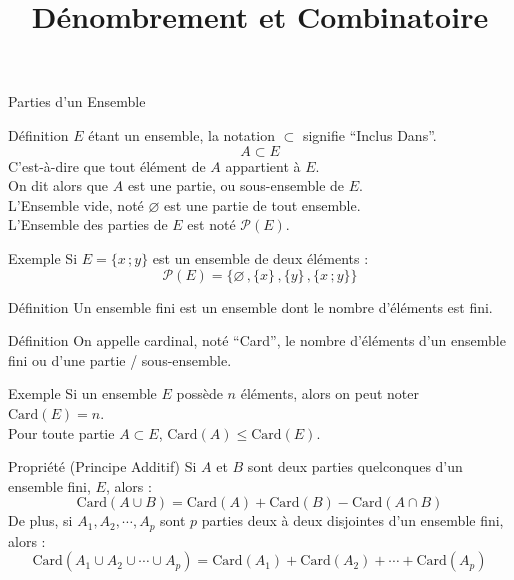 \documentclass{cours}
\begin{document}
    \title{Dénombrement et Combinatoire}

    \begin{Gpartie}{Parties d'un Ensemble}
        \begin{Spartie}{Définition}
            $E$ étant un ensemble, la notation $\subset$ signifie ``Inclus Dans''.
            \[A\subset E\]
            C'est-à-dire que tout élément de $A$ appartient à $E$. \\
            On dit alors que $A$ est une partie, ou sous-ensemble de $E$. \\
            L'Ensemble vide, noté $\varnothing$ est une partie de tout ensemble. \\
            L'Ensemble des parties de $E$ est noté $\mathcal{P}(E)$.
            \begin{SSpartie}{Exemple}
                Si $E=\{x\,;y\}$ est un ensemble de deux éléments :
                \[\mathcal{P}(E)=\{\varnothing\,,\{x\}\,,\{y\}\,,\{x\,;y\}\}\]
            \end{SSpartie}
        \end{Spartie}
        \begin{Spartie}{Définition}
            Un ensemble fini est un ensemble dont le nombre d'éléments est fini.
        \end{Spartie}
        \begin{Spartie}{Définition}
            On appelle cardinal, noté ``Card'', le nombre d'éléments d'un ensemble fini ou d'une partie / sous-ensemble.
            \begin{SSpartie}{Exemple}
                Si un ensemble $E$ possède $n$ éléments, alors on peut noter $\text{Card}(E)=n$. \\
                Pour toute partie $A\subset E$, $\text{Card}(A)\leq\text{Card}(E)$.
            \end{SSpartie}
        \end{Spartie}
        \begin{Spartie}{Propriété (Principe Additif)}
            Si $A$ et $B$ sont deux parties quelconques d'un ensemble fini, $E$, alors :
            \[\text{Card}(A\cup B)=\text{Card}(A)+\text{Card}(B)-\text{Card}(A\cap B)\]
            De plus, si $A_1, A_2, \cdots, A_p$ sont $p$ parties deux à deux disjointes d'un ensemble fini, alors :
            \[\text{Card}(A_1\cup A_2\cup\cdots\cup A_p)=\text{Card}(A_1)+\text{Card}(A_2)+\cdots+\text{Card}(A_p)\]

\end{Spartie}
\end{Gpartie}
\end{document}
